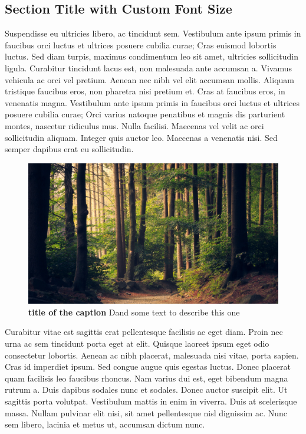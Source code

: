 \begin{refsection}
\section{\fontsize{11}{11}\selectfont Section Title with Custom Font Size}\label{intro:Sec1}

\vspace{5pt}

Suspendisse eu ultricies libero, ac tincidunt sem. Vestibulum ante ipsum primis in faucibus orci luctus et ultrices posuere cubilia curae; Cras euismod lobortis luctus. Sed diam turpis, maximus condimentum leo sit amet, ultricies sollicitudin ligula. Curabitur tincidunt lacus est, non malesuada ante accumsan a. Vivamus vehicula ac orci vel pretium. Aenean nec nibh vel elit accumsan mollis. Aliquam tristique faucibus eros, non pharetra nisi pretium et. Cras at faucibus eros, in venenatis magna. Vestibulum ante ipsum primis in faucibus orci luctus et ultrices posuere cubilia curae; Orci varius natoque penatibus et magnis dis parturient montes, nascetur ridiculus mus. Nulla facilisi. Maecenas vel velit ac orci sollicitudin aliquam. Integer quis auctor leo. Maecenas a venenatis nisi. Sed semper dapibus erat eu sollicitudin.

\FloatBarrier
\begin{figure}[!ht]
\includegraphics[width=1\textwidth]{../General_Intro/Images/nature_image2.pdf}
\caption{\textbf{title of the caption} Dand some text to describe this one }
\label{fig:Intro_Fig_1}
\end{figure}
\FloatBarrier

Curabitur vitae est sagittis erat pellentesque facilisis ac eget diam. Proin nec urna ac sem tincidunt porta eget at elit. Quisque laoreet ipsum eget odio consectetur lobortis. Aenean ac nibh placerat, malesuada nisi vitae, porta sapien. Cras id imperdiet ipsum. Sed congue augue quis egestas luctus. Donec placerat quam facilisis leo faucibus rhoncus. Nam varius dui est, eget bibendum magna rutrum a. Duis dapibus sodales nunc et sodales. Donec auctor suscipit elit. Ut sagittis porta volutpat. Vestibulum mattis in enim in viverra. Duis at scelerisque massa. Nullam pulvinar elit nisi, sit amet pellentesque nisl dignissim ac. Nunc sem libero, lacinia et metus ut, accumsan dictum nunc.


\end{refsection}
